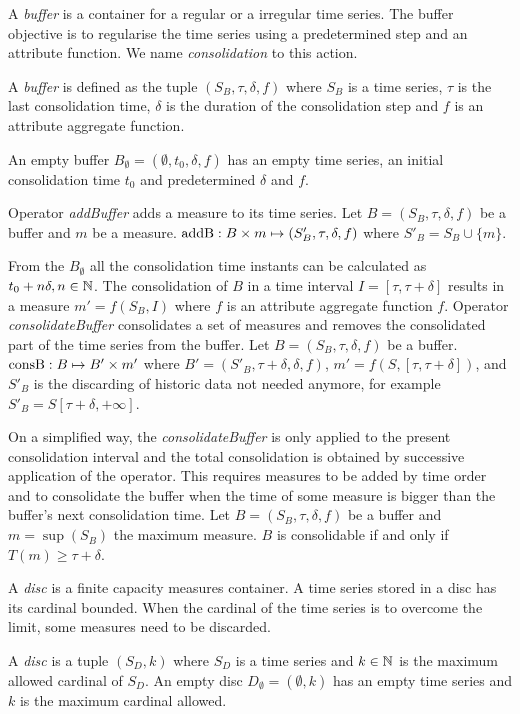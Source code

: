 A \emph{buffer} is a container for a regular or a irregular time
series. The buffer objective is to regularise the time series using a
predetermined step and an attribute function. We name
\emph{consolidation} to this action.
\begin{definition}%
  A \emph{buffer} is defined as the tuple $(S_B,\tau,\delta,f)$ where
  $S_B$ is a time series, $\tau$ is the last consolidation time,
  $\delta$ is the duration of the consolidation step and $f$ is an
  attribute aggregate function.

  An empty buffer $B_{\emptyset} = (\emptyset,t_0, \delta, f)$ has an
  empty time series, an initial consolidation time $t_0$ and
  predetermined $\delta$ and $f$.
\end{definition}

Operator \emph{addBuffer} adds a measure to its time series. Let $B=
(S_B,\tau,\delta,f)$ be a buffer and $m$ be a measure. $\operatorname{addB}: B
\times m \mapsto (S'_B,\tau,\delta,f)$ where $S'_B = S_B \cup \{m\} $.

From the $B_{\emptyset}$ all the consolidation time instants can be
calculated as $t_0+n\delta, n\in\mathbb{N}$. The consolidation of $B$ in a
time interval $I=[\tau,\tau+\delta]$ results in a measure
$m'=f(S_B,I)$ where $f$ is an attribute aggregate function
$f$. Operator \emph{consolidateBuffer} consolidates a set of measures
and removes the consolidated part of the time series from the
buffer. Let $B=(S_B,\tau,\delta,f)$ be a buffer. $\operatorname{consB} : B \mapsto
B' \times m'$ where $ B'= (S'_B,\tau+\delta,\delta,f)$, $m' =
f(S,[\tau,\tau+\delta])$, and $S'_B$ is the discarding of historic
data not needed anymore, for example $S'_B = S[\tau+\delta,+\infty]$.

On a simplified way, the \emph{consolidateBuffer} is only applied to the present
consolidation interval and the total consolidation is obtained by
successive application of the operator. This requires measures to be
added by time order and to consolidate the buffer when the time of
some measure is bigger than the buffer's next consolidation time.  Let
$B=(S_B,\tau,\delta,f)$ be a buffer and $m=\sup(S_B)$ the maximum
measure. $B$ is consolidable if and only if $T(m) \geq
\tau+\delta$.


A \emph{disc} is a finite capacity measures container. A time series
stored in a disc has its cardinal bounded. When the cardinal of the
time series is to overcome the limit, some measures need to be
discarded.
\begin{definition}%
  A \emph{disc} is a tuple $(S_D,k)$ where $S_D$ is a time series and
  $k\in\mathbb{N}$ is the maximum allowed cardinal of $S_D$.  An empty disc
  $D_{\emptyset} = (\emptyset,k)$ has an empty time series and $k$ is
  the maximum cardinal allowed.
\end{definition}

